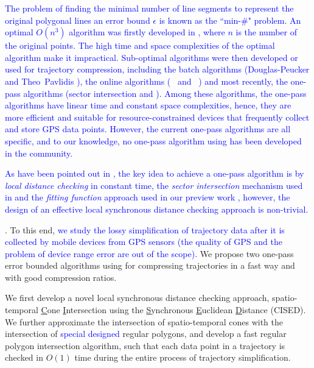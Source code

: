 \textcolor{blue}{The problem of finding the minimal number of line segments to represent the original polygonal lines \wrt an error bound $\epsilon$ is known as the ``min-\#" problem\cite{Imai:Optimal,Chan:Optimal}.}
%
\textcolor{blue}{An optimal $O(n^3)$  \lsa algorithm was firstly developed in \cite{Imai:Optimal}, where $n$ is the number of the original points. The high time and space complexities of the optimal \lsa algorithm make it impractical.}
%
\textcolor{blue}{Sub-optimal \lsa algorithms were then developed or used for trajectory compression, including the batch algorithms (\eg Douglas-Peucker \cite{Douglas:Peucker, Meratnia:Spatiotemporal, Cao:Spatio} and Theo~Pavlidis \cite{Pavlidis:Segment}), the online algorithms (\eg \bqsa~\cite{Liu:BQS} and \ \squishe \cite{Muckell:Compression}) and most recently, the one-pass algorithms (\eg sector intersection \cite{Williams:Longest, Sklansky:Cone, Dunham:Cone, Zhao:Sleeve} and \operb \cite {Lin:Operb}). }
%
\textcolor{blue}{Among these algorithms, the one-pass algorithms have linear time and constant space complexities, hence, they are more efficient and suitable for resource-constrained devices that frequently collect and store GPS data points. 
However, the current one-pass algorithms are all \ped specific, and to our knowledge, no one-pass \lsa algorithm using \sed has been developed in the community.}


\textcolor{blue}{As have been pointed out in \cite {Lin:Operb}, the key idea to achieve a one-pass algorithm is by \emph{local distance checking} in constant time, \eg the \textit{sector intersection} mechanism used in \cite{Williams:Longest, Sklansky:Cone, Dunham:Cone, Zhao:Sleeve} and the \textit{fitting function} approach used in our preview work \cite {Lin:Operb}, however, the design of an effective local synchronous distance checking approach is non-trivial.}



. To this end, 
\textcolor{blue}{we study the lossy simplification of trajectory data after it is collected by mobile devices from GPS sensors (the quality of GPS and the problem of device range error are out of the scope). }
We propose two one-pass error bounded \lsa algorithms using \sed for compressing trajectories in a fast way and with good compression ratios. %

 We first develop a novel local synchronous distance checking approach, \ie spatio-temporal \underline{C}one \underline{I}ntersection using the \underline{S}ynchronous \underline{E}uclidean \underline{D}istance (CISED).
We further approximate the intersection of spatio-temporal cones with the intersection of \textcolor{blue}{special designed} regular polygons, and develop a fast regular polygon intersection algorithm, such that each data point in a trajectory is checked in $O(1)$ time during the entire process of trajectory simplification.


